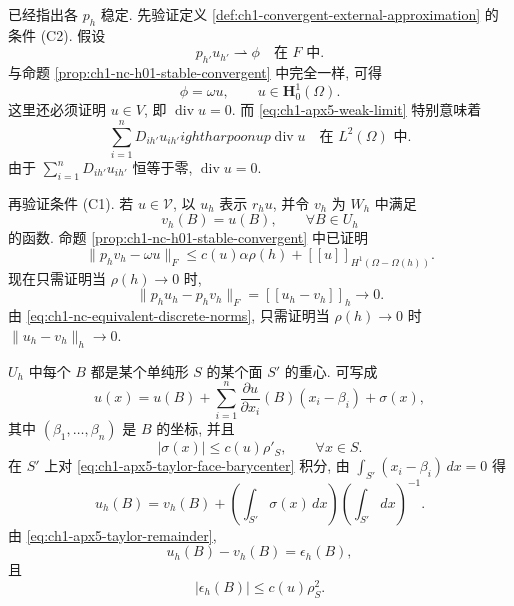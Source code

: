 \begin{Proof}
已经指出各 $p_h$ 稳定. 先验证定义 \ref{def:ch1-convergent-external-approximation} 的条件 (C2). 假设
\begin{equation}
p_{h'}u_{h'}\rightharpoonup\phi
\quad\text{在 }F\text{ 中}.
\label{eq:ch1-apx5-weak-limit}
\end{equation}
与命题 \ref{prop:ch1-nc-h01-stable-convergent} 中完全一样, 可得
\begin{equation}
\phi=\omega u,
\qquad u\in\mathbf H_0^1(\Omega).
\label{eq:ch1-apx5-limit-h01}
\end{equation}
这里还必须证明 $u\in V$, 即 $\operatorname{div}u=0$. 而 \eqref{eq:ch1-apx5-weak-limit} 特别意味着
\[
\sum_{i=1}^nD_{ih'}u_{ih'}
ightharpoonup\operatorname{div}u
\quad\text{在 }L^2(\Omega)\text{ 中}.
\]
由于 $\sum_{i=1}^nD_{ih'}u_{ih'}$ 恒等于零, $\operatorname{div}u=0$.

再验证条件 (C1). 若 $u\in\mathcal V$, 以 $u_h$ 表示 $r_hu$, 并令 $v_h$ 为 $W_h$ 中满足
\[
v_h(B)=u(B),
\qquad\forall B\in U_h
\]
的函数. 命题 \ref{prop:ch1-nc-h01-stable-convergent} 中已证明
\begin{equation}
\|p_hv_h-\omega u\|_F
\leq c(u)\alpha\rho(h)+[[u]]_{H^1(\Omega-\Omega(h))}.
\label{eq:ch1-apx5-point-interpolant-error}
\end{equation}
现在只需证明当 $\rho(h)\to0$ 时,
\begin{equation}
\|p_hu_h-p_hv_h\|_F=[[u_h-v_h]]_h\longrightarrow0.
\label{eq:ch1-apx5-interpolants-difference}
\end{equation}
由 \eqref{eq:ch1-nc-equivalent-discrete-norms}, 只需证明当 $\rho(h)\to0$ 时 $\|u_h-v_h\|_h\to0$.

$U_h$ 中每个 $B$ 都是某个单纯形 $S$ 的某个面 $S'$ 的重心. 可写成
\begin{equation}
u(x)=u(B)+\sum_{i=1}^n\frac{\partial u}{\partial x_i}(B)(x_i-\beta_i)+\sigma(x),
\label{eq:ch1-apx5-taylor-face-barycenter}
\end{equation}
其中 $(\beta_1,\ldots,\beta_n)$ 是 $B$ 的坐标, 并且
\begin{equation}
|\sigma(x)|\leq c(u)\rho'_S,
\qquad\forall x\in S.
\label{eq:ch1-apx5-taylor-remainder}
\end{equation}
在 $S'$ 上对 \eqref{eq:ch1-apx5-taylor-face-barycenter} 积分, 由 $\int_{S'}(x_i-\beta_i)\,dx=0$ 得
\[
u_h(B)=v_h(B)
+\left(\int_{S'}\sigma(x)\,dx\right)
\left(\int_{S'}dx\right)^{-1}.
\]
由 \eqref{eq:ch1-apx5-taylor-remainder},
\begin{equation}
u_h(B)-v_h(B)=\epsilon_h(B),
\label{eq:ch1-apx5-nodal-error}
\end{equation}
且
\begin{equation}
|\epsilon_h(B)|\leq c(u)\rho_S^2.
\label{eq:ch1-apx5-nodal-error-bound}
\end{equation}


\end{Proof}
